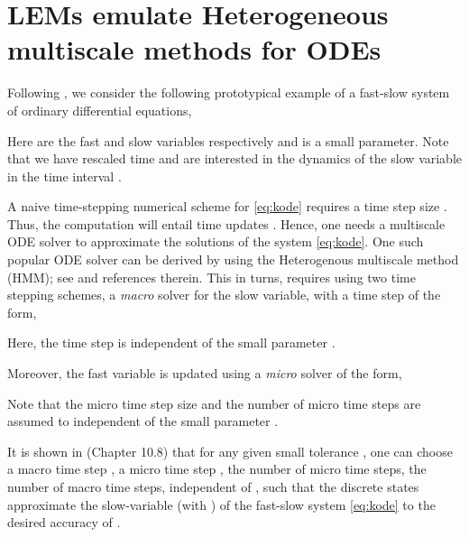 \documentclass{article} \usepackage{iclr2022_conference,times}
\begin{document}
\section{LEMs emulate Heterogeneous multiscale methods for ODEs}
\label{app:hmm}
Following \cite{Kuhn_book}, we consider the following prototypical example of a fast-slow system of ordinary differential equations, 

Here  are the fast and slow variables respectively and  is a small parameter. Note that we have rescaled time and are interested in the dynamics of the slow variable  in the time interval . 

A naive time-stepping numerical scheme for \eqref{eq:kode} requires a time step size . Thus, the computation will entail time updates . Hence, one needs a multiscale ODE solver to approximate the solutions of the system \eqref{eq:kode}. One such popular ODE solver can be derived by using the Heterogenous multiscale method (HMM); see \citet{Kuhn_book} and references therein. This in turns, requires using two time stepping schemes, a \emph{macro} solver for the slow variable, with a time step  of the form,

Here, the time step  is independent of the small parameter . 

Moreover, the fast variable is updated using a \emph{micro} solver of the form,

Note that the micro time step size  and the number of micro time steps  are assumed to independent of the small parameter .

It is shown in \cite{Kuhn_book} (Chapter 10.8) that for any given small tolerance , one can choose a macro time step , a micro time step , the number  of micro time steps, the number  of macro time steps, independent of , such that the discrete states  approximate the slow-variable  (with ) of the fast-slow system \eqref{eq:kode} to the desired accuracy of . 
\end{document}
